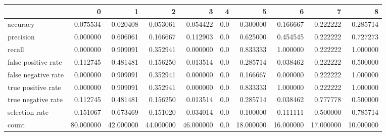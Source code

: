 \begin{tabular}{lrrrrrrrrr}
\toprule
{} &          0 &          1 &          2 &          3 &    4 &          5 &          6 &          7 &          8 \\
\midrule
accuracy            &   0.075534 &   0.020408 &   0.053061 &   0.054422 &  0.0 &   0.300000 &   0.166667 &   0.222222 &   0.285714 \\
precision           &   0.000000 &   0.606061 &   0.166667 &   0.112903 &  0.0 &   0.625000 &   0.454545 &   0.222222 &   0.727273 \\
recall              &   0.000000 &   0.909091 &   0.352941 &   0.000000 &  0.0 &   0.833333 &   1.000000 &   0.222222 &   1.000000 \\
false positive rate &   0.112745 &   0.481481 &   0.156250 &   0.013514 &  0.0 &   0.285714 &   0.038462 &   0.222222 &   0.500000 \\
false negative rate &   0.000000 &   0.909091 &   0.352941 &   0.000000 &  0.0 &   0.166667 &   0.000000 &   0.222222 &   1.000000 \\
true positive rate  &   0.000000 &   0.909091 &   0.352941 &   0.000000 &  0.0 &   0.833333 &   1.000000 &   0.222222 &   1.000000 \\
true negative rate  &   0.112745 &   0.481481 &   0.156250 &   0.013514 &  0.0 &   0.285714 &   0.038462 &   0.777778 &   0.500000 \\
selection rate      &   0.151067 &   0.673469 &   0.151020 &   0.034014 &  0.0 &   0.100000 &   0.111111 &   0.500000 &   0.785714 \\
count               &  80.000000 &  42.000000 &  44.000000 &  46.000000 &  0.0 &  18.000000 &  16.000000 &  17.000000 &  10.000000 \\
\bottomrule
\end{tabular}
